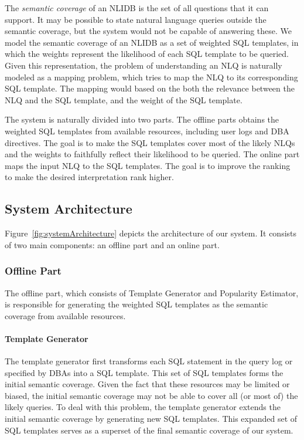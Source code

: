 \documentclass{vldb}
\begin{document}
The {\em semantic coverage} of an NLIDB is the set of all questions that it can support.  It may be possible to state natural language queries outside the semantic coverage, but the system would not be capable of answering these.  We model the semantic coverage of an NLIDB as a set of weighted SQL templates, in which the weights represent the likelihood of each SQL template to be queried.  Given this representation, the problem of understanding an NLQ is naturally modeled as a mapping problem, which tries to map the NLQ to its corresponding SQL template.  The mapping would based on the both the relevance between the NLQ and the SQL template, and the weight of the SQL template.

The system is naturally divided into two parts.  The offline parts obtains the weighted SQL templates from available resources, including user logs and DBA directives.  The goal is to make the SQL templates cover most of the likely NLQs and the weights to faithfully reflect their likelihood to be queried.  The online part maps the input NLQ to the SQL templates.  The goal is to improve the ranking to make the desired interpretation rank higher.

\subsection{System Architecture}
Figure~\ref{fig:systemArchitecture} depicts the architecture of our system. It consists of two main components: an offline part and an online part.  

\subsubsection{Offline Part}
The offline part, which consists of Template Generator and Popularity Estimator, is responsible for generating the weighted SQL templates as the semantic coverage from available resources.  

\paragraph*{Template Generator}
The template generator first transforms each SQL statement in the query log or specified by DBAs into a SQL template.  This set of SQL templates forms the initial semantic coverage.  Given the fact that these resources may be limited or biased, the initial semantic coverage may not be able to cover all (or most of) the likely queries.  To deal with this problem, the template generator extends the initial semantic coverage by generating new SQL templates.  This expanded set of SQL templates serves as a superset of the final semantic coverage of our system.  
\end{document}
